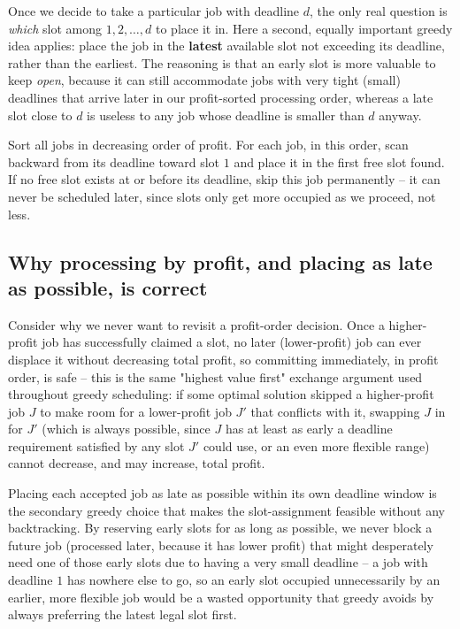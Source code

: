 Once we decide to take a particular job with deadline $d$, the only real
question is \emph{which} slot among $1, 2, \dots, d$ to place it in. Here a
second, equally important greedy idea applies: place the job in the
\textbf{latest} available slot not exceeding its deadline, rather than the
earliest. The reasoning is that an early slot is more valuable to keep
\emph{open}, because it can still accommodate jobs with very tight (small)
deadlines that arrive later in our profit-sorted processing order, whereas a
late slot close to $d$ is useless to any job whose deadline is smaller than
$d$ anyway.

\begin{ideabox}
Sort all jobs in decreasing order of profit. For each job, in this order,
scan backward from its deadline toward slot $1$ and place it in the first
free slot found. If no free slot exists at or before its deadline, skip this
job permanently -- it can never be scheduled later, since slots only get
more occupied as we proceed, not less.
\end{ideabox}

\subsection*{Why processing by profit, and placing as late as possible, is correct}

Consider why we never want to revisit a profit-order decision. Once a
higher-profit job has successfully claimed a slot, no later (lower-profit)
job can ever displace it without decreasing total profit, so committing
immediately, in profit order, is safe -- this is the same "highest value
first" exchange argument used throughout greedy scheduling: if some optimal
solution skipped a higher-profit job $J$ to make room for a lower-profit job
$J'$ that conflicts with it, swapping $J$ in for $J'$ (which is always
possible, since $J$ has at least as early a deadline requirement satisfied
by any slot $J'$ could use, or an even more flexible range) cannot decrease,
and may increase, total profit.

Placing each accepted job as late as possible within its own deadline window
is the secondary greedy choice that makes the slot-assignment feasible
without any backtracking. By reserving early slots for as long as possible,
we never block a future job (processed later, because it has lower profit)
that might desperately need one of those early slots due to having a very
small deadline -- a job with deadline $1$ has nowhere else to go, so an
early slot occupied unnecessarily by an earlier, more flexible job would be
a wasted opportunity that greedy avoids by always preferring the latest
legal slot first.

